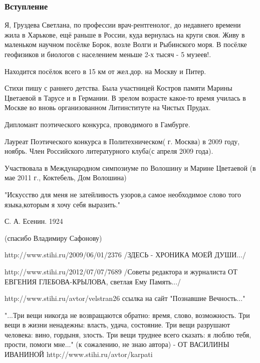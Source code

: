  
 
 

\subsubsection{Вступление}


Я, Груздева Светлана, по профессии врач-рентгенолог, до недавнего времени жила
в Харькове, ещё раньше в России, куда вернулась на круги своя. Живу в маленьком
научном посёлке Борок, возле Волги и Рыбинского моря. В посёлке геофизиков и
биологов с населением меньше 2-х тысяч - 5 музеев!.

Находится посёлок всего в 15 км от жел.дор. на Москву и Питер.

Стихи пишу с раннего детства. Была участницей Костров памяти Марины Цветаевой в
Тарусе и в Германии. В зрелом возрасте какое-то время училась в Москве во вновь
организованном Литинституте на Чистых Прудах.  

Дипломант поэтического конкурса, проводимого в Гамбурге.

Лауреат Поэтического конкурса в Политехническом( г. Москва) в 2009 году,
ноябрь.  Член Российского литературного клуба(с апреля 2009 года).

Участвовала в Международном симпозиуме по Волошину и Марине Цветаевой (в мае
2011 г., Коктебель, Дом Волошина)

"Искусство для меня не затейливость узоров,а самое необходимое слово того
языка,которым я хочу себя выразить."

С. А. Есенин. 1924

(спасибо Владимиру Сафонову)

http://www.stihi.ru/2009/06/01/2376
/ЗДЕСЬ - ХРОНИКА МОЕЙ ДУШИ.../

http://www.stihi.ru/2012/07/07/7689
/Советы редактора и журналиста ОТ ЕВГЕНИЯ ГЛЕБОВА-КРЫЛОВА, светлая Ему Память.../

http://www.stihi.ru/avtor/velstran26
ссылка на сайт "Познавшие Вечность..."

"...Три вещи никогда не возвращаются обратно: время, слово, возможность. Три вещи в жизни ненадежны: власть, удача, состояние.
Три вещи разрушают человека: вино, гордыня, злость. Три вещи труднее всего сказать: я люблю тебя, прости, помоги мне..." (к сожалению, не знаю автора) - ОТ ВАСИЛИНЫ ИВАНИНОЙ http://www.stihi.ru/avtor/karpati


